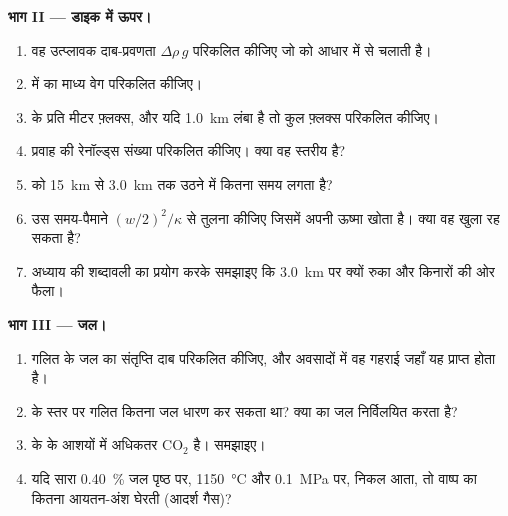 \begin{problem}
\noindent\textbf{भाग II --- डाइक में ऊपर।}
\begin{enumerate}[resume]
\item वह उत्प्लावक दाब-प्रवणता $\Delta\rho\,g$ परिकलित कीजिए जो  को
आधार में से चलाती है।
\item {} में  का माध्य वेग परिकलित कीजिए।
\item {} के प्रति मीटर फ़्लक्स, और यदि  \qty{1.0}{km} लंबा है तो कुल फ़्लक्स
परिकलित कीजिए।
\item प्रवाह की रेनॉल्ड्स संख्या परिकलित कीजिए। क्या वह स्तरीय है?
\item {} को \qty{15}{km} से \qty{3.0}{km} तक उठने में कितना समय लगता है?
\item उस समय-पैमाने $(w/2)^2/\kappa$ से तुलना कीजिए जिसमें  अपनी
ऊष्मा खोता है। क्या वह खुला रह सकता है?
\item अध्याय की शब्दावली का प्रयोग करके समझाइए कि  \qty{3.0}{km} पर क्यों रुका और
किनारों की ओर फैला।
\end{enumerate}

\noindent\textbf{भाग III --- जल।}
\begin{enumerate}[resume]
\item गलित के जल का संतृप्ति दाब परिकलित कीजिए, और अवसादों में वह गहराई
जहाँ यह प्राप्त होता है।
\item {} के स्तर पर गलित कितना जल धारण कर सकता था? क्या  का
 जल निर्विलयित करता है?
\item {} के  के आशयों में अधिकतर CO$_2$ है। समझाइए।
\item यदि सारा \qty{0.40}{\percent} जल पृष्ठ पर,
\qty{1150}{\celsius} और \qty{0.1}{MPa} पर, निकल आता, तो वाष्प  का कितना
आयतन-अंश घेरती (आदर्श गैस)?
\end{enumerate}


\end{problem}
